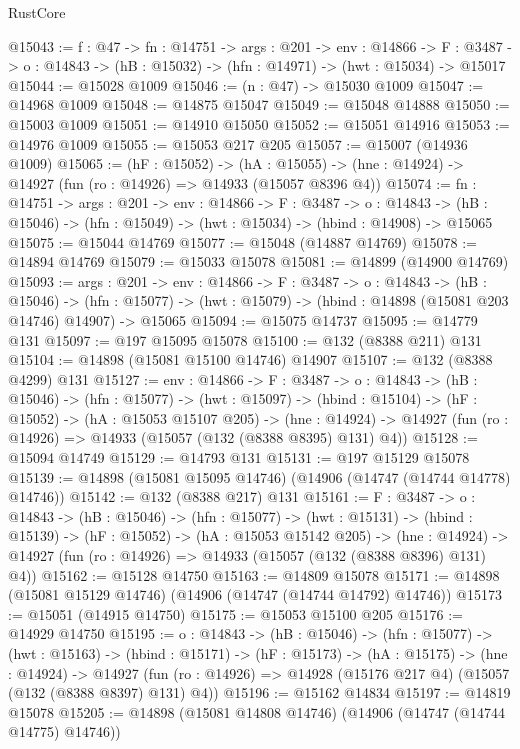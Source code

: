 \begin{lexlean}{RustCore}
\begin{coremodule}
@15043 := {f : @47} ->
  {fn : @14751} ->
  {args : @201} ->
  {env : @14866} ->
  {F : @3487} -> {o : @14843} -> (hB : @15032) -> (hfn : @14971) -> (hwt : @15034) -> @15017
@15044 := @15028 @1009
@15046 := (n : @47) -> @15030 @1009
@15047 := @14968 @1009
@15048 := @14875 @15047
@15049 := @15048 @14888
@15050 := @15003 @1009
@15051 := @14910 @15050
@15052 := @15051 @14916
@15053 := @14976 @1009
@15055 := @15053 @217 @205
@15057 := @15007 (@14936 @1009)
@15065 := (hF : @15052) ->
  (hA : @15055) -> (hne : @14924) -> @14927 (fun (ro : @14926) => @14933 (@15057 @8396 @4))
@15074 := {fn : @14751} ->
  {args : @201} ->
  {env : @14866} ->
  {F : @3487} ->
  {o : @14843} -> (hB : @15046) -> (hfn : @15049) -> (hwt : @15034) -> (hbind : @14908) -> @15065
@15075 := @15044 @14769
@15077 := @15048 (@14887 @14769)
@15078 := @14894 @14769
@15079 := @15033 @15078
@15081 := @14899 (@14900 @14769)
@15093 := {args : @201} ->
  {env : @14866} ->
  {F : @3487} ->
  {o : @14843} ->
  (hB : @15046) ->
  (hfn : @15077) -> (hwt : @15079) -> (hbind : @14898 (@15081 @203 @14746) @14907) -> @15065
@15094 := @15075 @14737
@15095 := @14779 @131
@15097 := @197 @15095 @15078
@15100 := @132 (@8388 @211) @131
@15104 := @14898 (@15081 @15100 @14746) @14907
@15107 := @132 (@8388 @4299) @131
@15127 := {env : @14866} ->
  {F : @3487} ->
  {o : @14843} ->
  (hB : @15046) ->
  (hfn : @15077) ->
  (hwt : @15097) ->
  (hbind : @15104) ->
  (hF : @15052) ->
  (hA : @15053 @15107 @205) ->
  (hne : @14924) -> @14927 (fun (ro : @14926) => @14933 (@15057 (@132 (@8388 @8395) @131) @4))
@15128 := @15094 @14749
@15129 := @14793 @131
@15131 := @197 @15129 @15078
@15139 := @14898 (@15081 @15095 @14746) (@14906 (@14747 (@14744 @14778) @14746))
@15142 := @132 (@8388 @217) @131
@15161 := {F : @3487} ->
  {o : @14843} ->
  (hB : @15046) ->
  (hfn : @15077) ->
  (hwt : @15131) ->
  (hbind : @15139) ->
  (hF : @15052) ->
  (hA : @15053 @15142 @205) ->
  (hne : @14924) -> @14927 (fun (ro : @14926) => @14933 (@15057 (@132 (@8388 @8396) @131) @4))
@15162 := @15128 @14750
@15163 := @14809 @15078
@15171 := @14898 (@15081 @15129 @14746) (@14906 (@14747 (@14744 @14792) @14746))
@15173 := @15051 (@14915 @14750)
@15175 := @15053 @15100 @205
@15176 := @14929 @14750
@15195 := {o : @14843} ->
  (hB : @15046) ->
  (hfn : @15077) ->
  (hwt : @15163) ->
  (hbind : @15171) ->
  (hF : @15173) ->
  (hA : @15175) ->
  (hne : @14924) ->
  @14927 (fun (ro : @14926) => @14928 (@15176 @217 @4) (@15057 (@132 (@8388 @8397) @131) @4))
@15196 := @15162 @14834
@15197 := @14819 @15078
@15205 := @14898 (@15081 @14808 @14746) (@14906 (@14747 (@14744 @14775) @14746))

\end{coremodule}
\end{lexlean}
